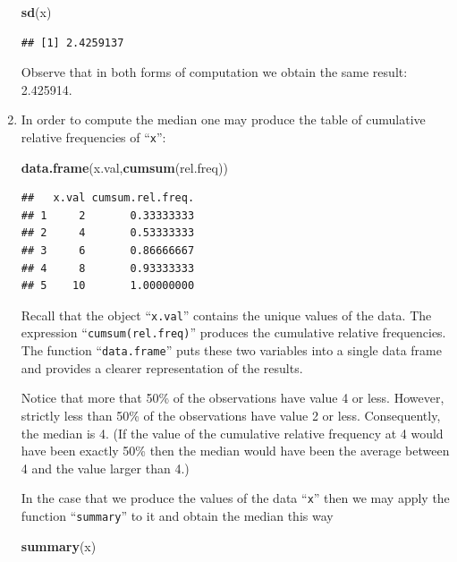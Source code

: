 \documentclass[]{krantz}
\makeatletter
\newenvironment{Shaded}{\begin{snugshade}}{\end{snugshade}}
\newcommand{\KeywordTok}[1]{\textcolor[rgb]{0.13,0.29,0.53}{\textbf{#1}}}
\newcommand{\NormalTok}[1]{#1}
\newenvironment{kframe}{%
\medskip{}
\setlength{\fboxsep}{.8em}
 \def\at@end@of@kframe{}%
 \ifinner\ifhmode%
  \def\at@end@of@kframe{\end{minipage}}%
  \begin{minipage}{\columnwidth}%
 \fi\fi%
 \def\FrameCommand##1{\hskip\@totalleftmargin \hskip-\fboxsep
 \colorbox{shadecolor}{##1}\hskip-\fboxsep
     \hskip-\linewidth \hskip-\@totalleftmargin \hskip\columnwidth}%
 \MakeFramed {\advance\hsize-\width
   \@totalleftmargin\z@ \linewidth\hsize
   \@setminipage}}%
 {\par\unskip\endMakeFramed%
 \at@end@of@kframe}
\renewenvironment{Shaded}{\begin{kframe}}{\end{kframe}}
\theoremstyle{definition}
\theoremstyle{definition}
\theoremstyle{definition}
\theoremstyle{remark}
\makeatother
\begin{document}
\begin{enumerate}
\begin{Shaded}
\begin{Highlighting}[]
\KeywordTok{sd}\NormalTok{(x)}
\end{Highlighting}
\end{Shaded}

\begin{verbatim}
## [1] 2.4259137
\end{verbatim}

  Observe that in both forms of computation we obtain the same result:
  2.425914.
\item
  In order to compute the median one may produce the table of cumulative
  relative frequencies of ``\texttt{x}'':

\begin{Shaded}
\begin{Highlighting}[]
\KeywordTok{data.frame}\NormalTok{(x.val,}\KeywordTok{cumsum}\NormalTok{(rel.freq))}
\end{Highlighting}
\end{Shaded}

\begin{verbatim}
##   x.val cumsum.rel.freq.
## 1     2       0.33333333
## 2     4       0.53333333
## 3     6       0.86666667
## 4     8       0.93333333
## 5    10       1.00000000
\end{verbatim}

  Recall that the object ``\texttt{x.val}'' contains the unique values
  of the data. The expression ``\texttt{cumsum(rel.freq)}'' produces the
  cumulative relative frequencies. The function ``\texttt{data.frame}''
  puts these two variables into a single data frame and provides a
  clearer representation of the results.

  Notice that more that 50\% of the observations have value 4 or less.
  However, strictly less than 50\% of the observations have value 2 or
  less. Consequently, the median is 4. (If the value of the cumulative
  relative frequency at 4 would have been exactly 50\% then the median
  would have been the average between 4 and the value larger than 4.)

  In the case that we produce the values of the data ``\texttt{x}'' then
  we may apply the function ``\texttt{summary}'' to it and obtain the
  median this way

\begin{Shaded}
\begin{Highlighting}[]
\KeywordTok{summary}\NormalTok{(x)}
\end{Highlighting}
\end{Shaded}


\end{enumerate}
\end{document}
